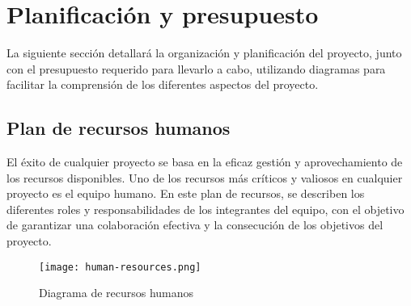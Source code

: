 \section{Planificación y presupuesto}
La siguiente sección detallará la organización y planificación del proyecto, 
junto con el presupuesto requerido para llevarlo a cabo, utilizando diagramas 
para facilitar la comprensión de los diferentes aspectos del proyecto.

\subsection{Plan de recursos humanos}
El éxito de cualquier proyecto se basa en la eficaz gestión y aprovechamiento 
de los recursos disponibles. Uno de los recursos más críticos y valiosos en 
cualquier proyecto es el equipo humano. En este plan de recursos, se describen 
los diferentes roles y responsabilidades de los integrantes del equipo, con el 
objetivo de garantizar una colaboración efectiva y la consecución de los objetivos 
del proyecto.

\begin{figure}[ht]
    \centering
    \texttt{[image: human-resources.png]}
    \caption{Diagrama de recursos humanos}
    \label{fig:human-resources}
\end{figure}

